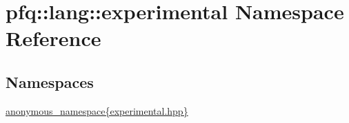 \hypertarget{namespacepfq_1_1lang_1_1experimental}{\section{pfq\+:\+:lang\+:\+:experimental Namespace Reference}
\label{namespacepfq_1_1lang_1_1experimental}
}
\subsection*{Namespaces}
\begin{DoxyCompactItemize}
\item 
 \hyperlink{namespacepfq_1_1lang_1_1experimental_1_1anonymous__namespace_02experimental_8hpp_03}{anonymous\+\_\+namespace\{experimental.\+hpp\}}
\end{DoxyCompactItemize}
